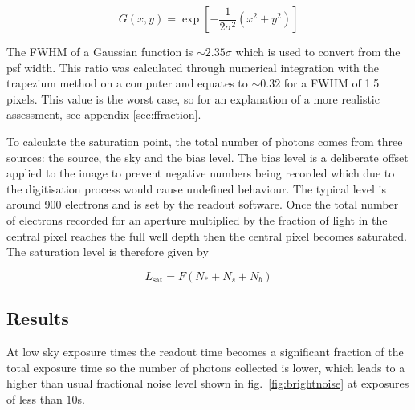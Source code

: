 \documentclass[a4paper]{report}
\begin{document}

\[
G(x,y) = \exp \left[
		-\frac{1}{2\sigma^{2}} \left(
			x^{2} + y^{2}
		\right)
	\right]
\]

The FWHM of a Gaussian function is $\sim 2.35 \sigma$ which is used to
convert from the psf width. This ratio was calculated through numerical
integration with the trapezium method on a computer and equates to $\sim
0.32$ for a FWHM of 1.5 pixels. This value is the worst case, so for an
explanation of a more realistic assessment, see appendix \ref{sec:ffraction}.


To calculate the saturation point, the total number of photons comes
from three sources: the source, the sky and the bias level. The bias
level is a deliberate offset applied to the image to prevent negative
numbers being recorded which due to the digitisation process would cause
undefined behaviour. The typical level is around 900 electrons and is
set by the readout software. Once the total number of electrons recorded
for an aperture multiplied by the fraction of light in the central pixel
reaches the full well depth then the central pixel becomes saturated.
The saturation level is therefore given by

\[
    L_{\mathrm{sat}} = F  (N_{\ast} + N_{s} + N_{b})
    \]



\subsection{Results}

At low sky exposure times the readout time becomes a significant fraction of the total exposure time so the number of photons collected is lower, which leads to a higher than usual fractional noise level shown in fig.~\ref{fig:brightnoise} at exposures of less than $10$s.
\end{document}
